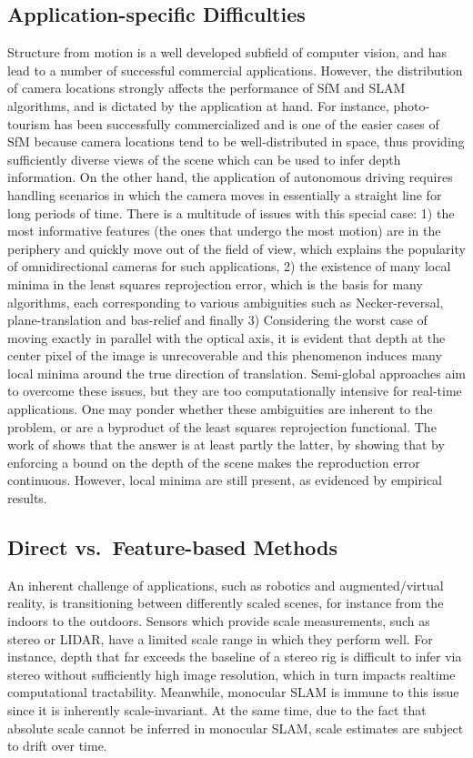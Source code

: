 \documentclass[10pt]{article}
\begin{document}
\subsection{Application-specific Difficulties}
Structure from motion is a well developed subfield of computer vision, and has lead to a number of successful commercial applications. However, the distribution of camera locations strongly affects the performance of SfM and SLAM algorithms, and is dictated by the application at hand. For instance, photo-tourism has been successfully commercialized and is one of the easier cases of SfM because camera locations tend to be well-distributed in space, thus providing sufficiently diverse views of the scene which can be used to infer depth information. On the other hand, the application of autonomous driving requires handling scenarios in which the camera moves in essentially a straight line for long periods of time. There is a multitude of issues with this special case: 1) the most informative features (the ones that undergo the most motion) are in the periphery and quickly move out of the field of view, which explains the popularity of omnidirectional cameras for such applications, 2) the existence of many local minima in the least squares reprojection error, which is the basis for many algorithms, each corresponding to various ambiguities such as Necker-reversal, plane-translation and bas-relief and finally 3) Considering the worst case of moving exactly in parallel with the optical axis, it is evident that depth at the center pixel of the image is unrecoverable and this phenomenon induces many local minima around the true direction of translation. Semi-global approaches aim to overcome these issues, but they are too computationally intensive for real-time applications. One may ponder whether these ambiguities are inherent to the problem, or are a byproduct of the least squares reprojection functional. The work of \cite{VGSoattoMovingForward} shows that the answer is at least partly the latter, by showing that by enforcing a bound on the depth of the scene makes the reproduction error continuous. However, local minima are still present, as evidenced by empirical results. 

\subsection{Direct vs.~Feature-based Methods}
An inherent challenge of applications, such as robotics and augmented/virtual reality, is transitioning between differently scaled scenes, for instance from the indoors to the outdoors. Sensors which provide scale measurements, such as stereo or LIDAR, have a limited scale range in which they perform well. For instance, depth that far exceeds the baseline of a stereo rig is difficult to infer via stereo without sufficiently high image resolution, which in turn impacts realtime computational tractability. Meanwhile, monocular SLAM is immune to this issue since it is inherently scale-invariant.  At the same time, due to the fact that absolute scale cannot be inferred in monocular SLAM, scale estimates are subject to drift over time. 
\end{document}
